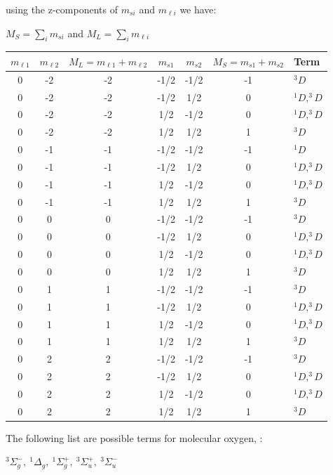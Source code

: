 \documentclass[12pt]{exam}
\begin{document}
\begin{questions}
\begin{parts}
\begin{solution}
using the z-components of \(m_{si}\) and \(m_{\ell i}\) we have:

\(M_S = \sum_i m_{si}\) and \(M_L = \sum_i m_{\ell i}\)

\vspace{0.2in}
\begin{tabular}{ccccccl}
\(m_{\ell 1}\) & \(m_{\ell 2}\) & \(M_L = m_{\ell 1} + m_{\ell 2}\) & \(m_{s 1}\) & \(m_{s 2}\) & \(M_S = m_{s1} + m_{s2}\) & Term\\\hline
0 & -2 & -2 & -1/2 & -1/2 & -1 & \(^3D\)\\
0 & -2 & -2 & -1/2 & 1/2 & 0 & \(^1D, ^3D\)\\
0 & -2 & -2 & 1/2 & -1/2 & 0 & \(^1D, ^3D\)\\
0 & -2 & -2 & 1/2 & 1/2 & 1 & \(^3D\)\\
0 & -1 & -1 & -1/2 & -1/2 & -1 & \(^1D\)\\
0 & -1 & -1 & -1/2 & 1/2 & 0 & \(^1D, ^3D\)\\
0 & -1 & -1 & 1/2 & -1/2 & 0 & \(^1D, ^3D\)\\
0 & -1 & -1 & 1/2 & 1/2 & 1 & \(^3D\)\\
0 & 0 & 0 & -1/2 & -1/2 & -1 & \(^3D\)\\
0 & 0 & 0 & -1/2 & 1/2 & 0 & \(^1D, ^3D\)\\
0 & 0 & 0 & 1/2 & -1/2 & 0 & \(^1D, ^3D\)\\
0 & 0 & 0 & 1/2 & 1/2 & 1 & \(^3D\)\\
0 & 1 & 1 & -1/2 & -1/2 & -1 & \(^3D\)\\
0 & 1 & 1 & -1/2 & 1/2 & 0 & \(^1D, ^3D\)\\
0 & 1 & 1 & 1/2 & -1/2 & 0 & \(^1D, ^3D\)\\
0 & 1 & 1 & 1/2 & 1/2 & 1 & \(^3D\)\\
0 & 2 & 2 & -1/2 & -1/2 & -1 & \(^3D\)\\
0 & 2 & 2 & -1/2 & 1/2 & 0 & \(^1D, ^3D\)\\
0 & 2 & 2 & 1/2 & -1/2 & 0 & \(^1D, ^3D\)\\
0 & 2 & 2 & 1/2 & 1/2 & 1 & \(^3D\)\\\hline
\end{tabular}
\end{solution}
\end{parts}

\question The following list are possible terms for molecular oxygen, :

\(^3\Sigma_g^-,\ ^1\Delta_g,\ ^1\Sigma_g^+,\ ^3\Sigma_u^+,\ ^3\Sigma_u^-\)


\end{questions}
\end{document}
